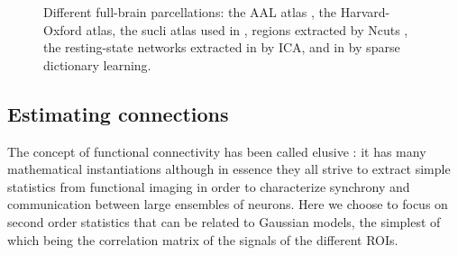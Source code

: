 \documentclass[5p]{elsarticle}
\begin{document}
\begin{figure}
\caption{
Different full-brain parcellations: the AAL atlas
\cite{tzourio-mazoyer2002a}, the Harvard-Oxford atlas, the sucli atlas used in
\cite{varoquaux2010c}, regions extracted by Ncuts
\cite{craddock2011}, the resting-state networks extracted in
\cite{smith2009} by ICA, and in \cite{varoquaux2011} by sparse dictionary
learning.
\label{fig:parcellations}
}
\end{figure}

\subsection{Estimating connections}

The concept of functional connectivity has been called elusive
\cite{horwitz2003}: it has many mathematical instantiations although in
essence they all strive to extract simple statistics from functional
imaging in order to characterize synchrony and communication between large
ensembles of neurons. Here we choose to focus on second order statistics
that can be related to Gaussian models, the simplest of which being the
correlation matrix of the signals of the different ROIs.
\end{document}
